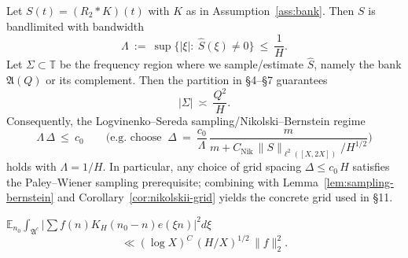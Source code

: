 \begin{lemma}\label{lem:bandwidth-bookkeeping}
Let $S(t)=(R_2*K)(t)$ with $K$ as in Assumption~\ref{ass:bank}. Then $S$ is bandlimited with bandwidth
\[
\Lambda\ :=\ \sup\{|\xi|:\ \widehat S(\xi)\ne 0\}\ \le\ \frac{1}{H}.
\]
Let $\Sigma\subset\mathbb T$ be the frequency region where we sample/estimate $\widehat S$, namely the bank $\mathfrak A(Q)$ or its complement. Then the partition in §4–§7 guarantees
\[
|\Sigma|\ \asymp\ \frac{Q^2}{H}.
\]
Consequently, the Logvinenko–Sereda sampling/Nikolski–Bernstein regime
\[
\Lambda\,\Delta\ \le\ c_0\qquad\Big(\text{e.g.\ choose }\ \Delta\ =\ \frac{c_0}{\Lambda}\,\frac{m}{m+C_{\mathrm{Nik}}\,\|S\|_{\ell^2([X,2X])}/H^{1/2}}\Big)
\]
holds with $\Lambda=1/H$. In particular, any choice of grid spacing $\Delta\le c_0\,H$ satisfies the Paley–Wiener sampling prerequisite; combining with Lemma~\ref{lem:sampling-bernstein} and Corollary~\ref{cor:nikolskii-grid} yields the concrete grid used in §11.
\end{lemma}

\begin{theorem}\label{thm:SSU-a}
$\mathbb E_{n_0}\int_{\mathfrak A^c}\Big|\sum f(n)K_H(n_0-n)e(\xi n)\Big|^2 d\xi$
\[ \ll (\log X)^C\,(H/X)^{1/2}\,\|f\|_2^2. \]
\end{theorem}

